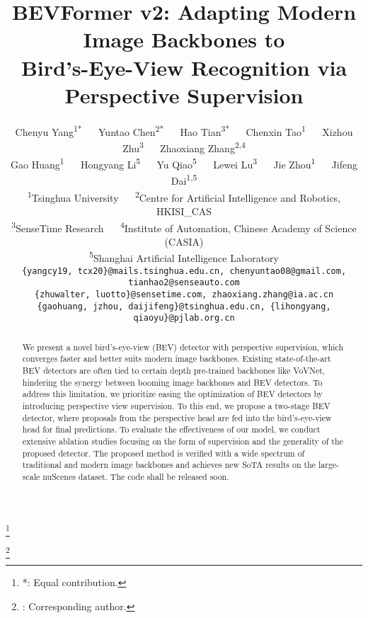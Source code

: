 \documentclass[10pt,twocolumn,letterpaper]{article}
\newcommand\blfootnote[1]{\begingroup
  \renewcommand\thefootnote{}\footnote{#1}\addtocounter{footnote}{-1}\endgroup
}
\begin{document}
\title{BEVFormer v2: Adapting Modern Image Backbones to \\ Bird's-Eye-View Recognition via Perspective Supervision}

\author{Chenyu Yang\textsuperscript{\rm 1*} ~~ 
Yuntao Chen\textsuperscript{\rm 2*} ~~ 
Hao Tian\textsuperscript{\rm 3*} ~~ 
Chenxin Tao\textsuperscript{\rm 1} ~~ 
Xizhou Zhu\textsuperscript{\rm 3} ~~ 
Zhaoxiang Zhang\textsuperscript{\rm 2,4} \\
Gao Huang\textsuperscript{\rm 1} ~~ 
Hongyang Li\textsuperscript{\rm 5} ~~
Yu Qiao\textsuperscript{\rm 5} ~~
Lewei Lu\textsuperscript{\rm 3} ~~ 
Jie Zhou\textsuperscript{\rm 1} ~~
Jifeng Dai\textsuperscript{\rm 1,5\Letter}
\\ [0.15cm]
\textsuperscript{\rm 1}Tsinghua University ~~ 
\textsuperscript{\rm 2}Centre for Artificial Intelligence and Robotics, HKISI\_CAS \\ 
\textsuperscript{\rm 3}SenseTime Research ~~
\textsuperscript{\rm 4}Institute of Automation, Chinese Academy of Science (CASIA) \\
\textsuperscript{\rm 5}Shanghai Artificial Intelligence Laboratory
\\ [0.15cm]
{\tt\small \{yangcy19, tcx20\}@mails.tsinghua.edu.cn, chenyuntao08@gmail.com, tianhao2@senseauto.com}\\
{\tt\small \{zhuwalter, luotto\}@sensetime.com, zhaoxiang.zhang@ia.ac.cn}\\
{\tt\small \{gaohuang, jzhou, daijifeng\}@tsinghua.edu.cn, \{lihongyang, qiaoyu\}@pjlab.org.cn}
}

\maketitle

\begin{abstract}
We present a novel bird's-eye-view (BEV) detector with perspective supervision, which converges faster and better suits modern image backbones.
Existing state-of-the-art BEV detectors are often tied to certain depth pre-trained backbones like VoVNet, hindering the synergy between booming image backbones and BEV detectors.
To address this limitation, we prioritize easing the optimization of BEV detectors by introducing perspective view supervision.
To this end, we propose a two-stage BEV detector, where proposals from the perspective head are fed into the bird's-eye-view head for final predictions.
To evaluate the effectiveness of our model, we conduct extensive ablation studies focusing on the form of supervision and the generality of the proposed detector.
The proposed method is verified with a wide spectrum of traditional and modern image backbones and achieves new SoTA results on the large-scale nuScenes dataset.
The code shall be released soon.
\end{abstract} \blfootnote{*: Equal contribution.}
\blfootnote{\Letter: Corresponding author.}
\end{document}
